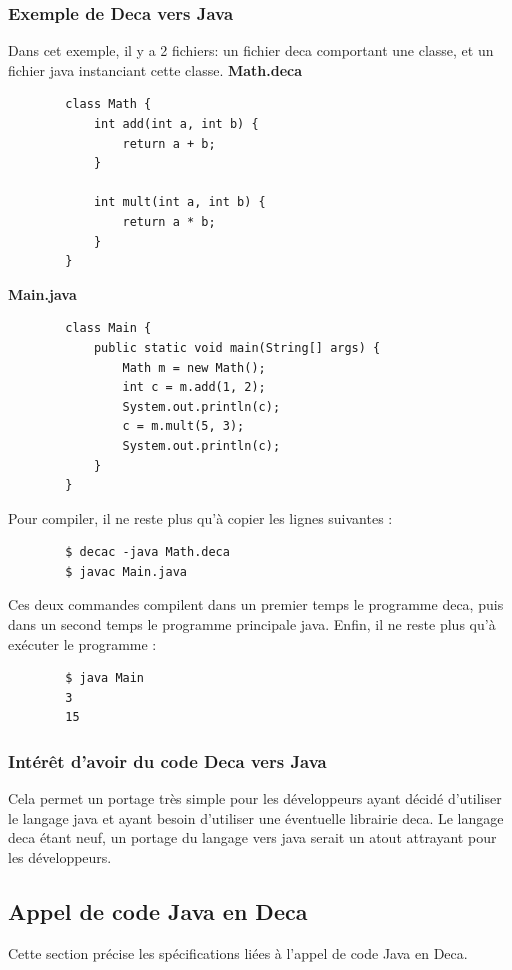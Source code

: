 \documentclass[12pt, a4paper, one side]{article}
\begin{document}
    \subsubsection{Exemple de Deca vers Java}

    Dans cet exemple, il y a 2 fichiers: un fichier deca comportant une classe, et
    un fichier java instanciant cette classe. \newline
    \newpage
    \textbf{Math.deca}
    \begin{verbatim}
        class Math {
        	int add(int a, int b) {
        		return a + b;
        	}

        	int mult(int a, int b) {
        		return a * b;
        	}
        }
    \end{verbatim}

    \textbf{Main.java}
    \begin{verbatim}
        class Main {
        	public static void main(String[] args) {
        		Math m = new Math();
        		int c = m.add(1, 2);
        		System.out.println(c);
        		c = m.mult(5, 3);
        		System.out.println(c);
        	}
        }
    \end{verbatim}

    Pour compiler, il ne reste plus qu'à copier les lignes suivantes :
    \begin{verbatim}
        $ decac -java Math.deca
        $ javac Main.java
    \end{verbatim}

    Ces deux commandes compilent dans un premier temps le programme deca, puis
    dans un second temps le programme principale java. Enfin, il ne reste plus qu'à
    exécuter le programme :

    \begin{verbatim}
        $ java Main
        3
        15
    \end{verbatim}

    \subsubsection{Intérêt d'avoir du code Deca vers Java}

    Cela permet un portage très simple pour les développeurs ayant décidé
    d'utiliser le langage java et ayant besoin d'utiliser une éventuelle librairie deca.
    Le langage deca étant neuf, un portage du langage vers java serait un atout attrayant pour les développeurs.

    \subsection{Appel de code Java en Deca}
    Cette section précise les spécifications liées à l'appel de code Java en Deca.
\end{document}
